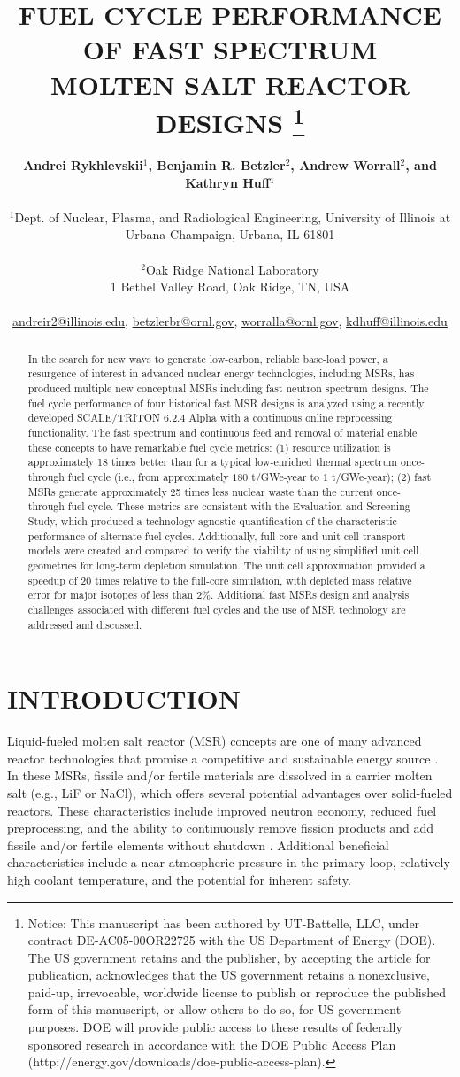 \documentclass[letterpaper]{mandc2019}
\title{FUEL CYCLE PERFORMANCE OF FAST SPECTRUM \\
  MOLTEN SALT REACTOR DESIGNS
\footnote{Notice:  This manuscript has been authored by UT-Battelle, LLC, under contract DE-AC05-00OR22725 with the US Department of Energy (DOE). The US government retains and the publisher, by accepting the article for publication, acknowledges that the US government retains a nonexclusive, paid-up, irrevocable, worldwide license to publish or reproduce the published form of this manuscript, or allow others to do so, for US government purposes. DOE will provide public access to these results of federally sponsored research in accordance with the DOE Public Access Plan (http://energy.gov/downloads/doe-public-access-plan).}
		}
\author{%
  \textbf{Andrei Rykhlevskii$^1$, Benjamin R. Betzler$^2$, Andrew Worrall$^2$, and Kathryn Huff$^1$} \\
\\
  $^1$Dept. of Nuclear, Plasma, and Radiological Engineering, University of Illinois at \\
  Urbana-Champaign, Urbana, IL 61801 \\
\\
  $^2$Oak Ridge National Laboratory \\
1 Bethel Valley Road, Oak Ridge, TN, USA  \\
\\
  \url{andreir2@illinois.edu}, \url{betzlerbr@ornl.gov}, \url{worralla@ornl.gov}, \url{kdhuff@illinois.edu}
}
\begin{document}
\maketitle
\justify

\begin{abstract}
In the search for new ways to generate low-carbon, reliable base-load power, a resurgence of interest in advanced nuclear energy technologies, including \glspl{MSR}, has produced multiple new conceptual \glspl{MSR} including fast neutron spectrum designs. 
The fuel cycle performance of four historical fast \gls{MSR} designs is analyzed using a recently developed SCALE/TRITON 6.2.4 Alpha with a continuous online reprocessing functionality.
The fast spectrum and continuous feed and removal of material enable these concepts to have remarkable fuel cycle metrics: (1) resource utilization is approximately 18 times better than for a typical low-enriched thermal spectrum once-through fuel cycle (i.e., from approximately $180$ t/GWe-year to $1$ t/GWe-year); (2) fast \glspl{MSR} generate approximately 25 times less nuclear waste than the current once-through fuel cycle.
These metrics are consistent with the Evaluation and Screening Study, which produced a technology-agnostic quantification of the characteristic performance of alternate fuel cycles.
Additionally, full-core and unit cell transport models were created and compared to verify the viability of using simplified unit cell geometries for long-term depletion simulation.
The unit cell approximation provided a speedup of 20 times relative to the full-core simulation, with depleted mass relative error for major isotopes of less than 2\%.
Additional fast \glspl{MSR} design and analysis challenges associated with different fuel cycles and the use of \gls{MSR} technology are addressed and discussed.
\end{abstract}

\section{INTRODUCTION}
\label{sec:intro}
Liquid-fueled molten salt reactor (\gls{MSR}) concepts are one of many advanced reactor technologies that promise a competitive and sustainable energy source \cite{siemer_why_2015}.
In these \gls{MSR}s, fissile and/or fertile materials are dissolved in a carrier molten salt (e.g., LiF or NaCl), which offers several potential advantages over solid-fueled reactors.
These characteristics include improved neutron economy, reduced fuel preprocessing, and the ability to continuously remove fission products and add fissile and/or fertile elements without shutdown \cite{leblanc_molten_2010}.
Additional beneficial characteristics include a near-atmospheric pressure in the primary loop, relatively high coolant temperature, and the potential for inherent safety. 
\end{document}
